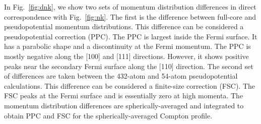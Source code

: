 \documentclass[aps,prb,showpacs,preprintnumbers,amsmath,amssymb,superscriptaddress,twocolumn]{revtex4}
\begin{document}
In Fig.~\ref{fig:dnk}, we show two sets of momentum distribution differences in direct correspondence with Fig.~\ref{fig:nk}. The first is the difference between full-core and pseudopotential momentum distributions. This difference can be considered a pseudopotential correction (PPC). The PPC is largest inside the Fermi surface. It has a parabolic shape and a discontinuity at the Fermi momentum. The PPC is mostly negative along the [100] and [111] directions. However, it shows positive peaks near the secondary Fermi surface along the [110] direction. The second set of differences are taken between the 432-atom and 54-atom pseudopotential calculations. This difference can be considered a finite-size correction (FSC). The FSC peaks at the Fermi surface and is essentially zero at high momenta. The momentum distribution differences are spherically-averaged and integrated to obtain PPC and FSC for the spherically-averaged Compton profile.
\end{document}

